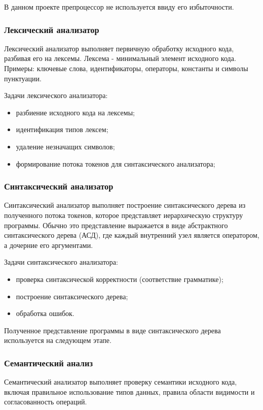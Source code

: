 В данном проекте препроцессор не используется ввиду его избыточности.

\subsubsection{Лексический анализатор}
Лексический анализатор выполняет первичную обработку исходного кода, разбивая его на лексемы. Лексема - минимальный элемент исходного кода. Примеры: ключевые слова, идентификаторы, операторы, константы и символы пунктуации.

Задачи лексического анализатора:
\begin{itemize}
    \item разбиение исходного кода на лексемы;
    \item идентификация типов лексем;
    \item удаление незначащих символов;
    \item формирование потока токенов для синтаксического анализатора;
\end{itemize}

\subsubsection{Синтаксический анализатор}

Синтаксический анализатор выполняет построение синтаксического дерева из полученного потока токенов, которое представляет иерархическую структуру программы. Обычно это представление выражается в виде абстрактного синтаксического дерева (АСД), где каждый внутренний узел является оператором, а дочерние его аргументами.

Задачи синтаксического анализатора:
\begin{itemize}
    \item проверка синтаксической корректности (соответствие грамматике);
    \item построение синтаксического дерева;
    \item обработка ошибок.
\end{itemize}

Полученное представление программы в виде синтаксического дерева используется на следующем этапе. 

\subsubsection{Семантический анализ}
Семантический анализатор выполняет проверку семантики исходного кода, включая правильное использование типов данных, правила области видимости и согласованность операций. 


